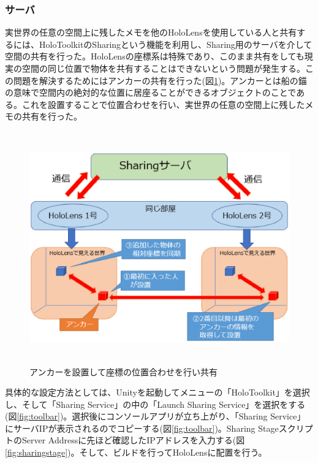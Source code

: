 \documentclass[11pt,a4j, titlepage]{jarticle} %
\begin{document}
\subsubsection{サーバ}
実世界の任意の空間上に残したメモを他のHoloLensを使用している人と共有するには、HoloToolkitのSharing\cite{sharing}という機能を利用し、Sharing用のサーバを介して空間の共有を行った。HoloLensの座標系は特殊であり、このまま共有をしても現実の空間の同じ位置で物体を共有することはできないという問題が発生する。この問題を解決するためにはアンカーの共有を行った(図\ref{fig:sharing})。アンカーとは船の錨の意味で空間内の絶対的な位置に居座ることができるオブジェクトのことである。これを設置することで位置合わせを行い、実世界の任意の空間上に残したメモの共有を行った。

\begin{figure}[H]
  \begin{center}
    \includegraphics[clip,height=10.0cm,width=14.0cm]{./sharing.eps}
    \caption{アンカーを設置して座標の位置合わせを行い共有}
    \label{fig:sharing}
  \end{center}
\end{figure}

具体的な設定方法としては、Unityを起動してメニューの「HoloToolkit」を選択し、そして「Sharing Service」の中の「Launch Sharing Service」を選択をする(図\ref{fig:toolbar})。選択後にコンソールアプリが立ち上がり、「Sharing Service」にサーバIPが表示されるのでコピーする(図\ref{fig:toolbar})。Sharing StageスクリプトのServer Addressに先ほど確認したIPアドレスを入力する(図\ref{fig:sharingstage})。そして、ビルドを行ってHoloLensに配置を行う。
\end{document}
